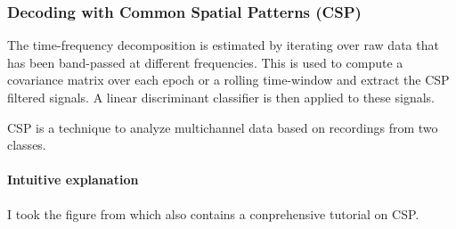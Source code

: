 \subsubsection{Decoding with Common Spatial Patterns (CSP)}

The time-frequency decomposition is estimated by iterating over raw data that
has been band-passed at different frequencies. This is used to compute a
covariance matrix over each epoch or a rolling time-window and extract the CSP
filtered signals. A linear discriminant classifier is then applied to these
signals.

CSP is a technique to analyze multichannel data based on recordings from two classes.

\paragraph{Intuitive explanation}


I took the figure from \cite{blankertz2007optimizing} which also contains a conprehensive tutorial on CSP.

